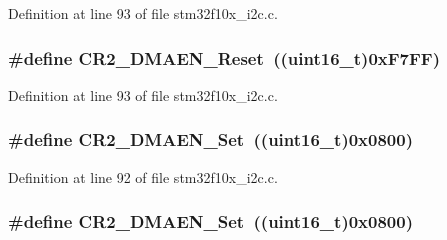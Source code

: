 Definition at line 93 of file stm32f10x\+\_\+i2c.\+c.

\subsubsection[{\texorpdfstring{C\+R2\+\_\+\+D\+M\+A\+E\+N\+\_\+\+Reset}{CR2_DMAEN_Reset}}]{\setlength{\rightskip}{0pt plus 5cm}\#define C\+R2\+\_\+\+D\+M\+A\+E\+N\+\_\+\+Reset~(({\bf uint16\+\_\+t})0x\+F7\+F\+F)}\hypertarget{group___i2_c___private___defines_gabe742f89a768e29b9a2d86f7782991a6}{}\label{group___i2_c___private___defines_gabe742f89a768e29b9a2d86f7782991a6}


Definition at line 93 of file stm32f10x\+\_\+i2c.\+c.

\subsubsection[{\texorpdfstring{C\+R2\+\_\+\+D\+M\+A\+E\+N\+\_\+\+Set}{CR2_DMAEN_Set}}]{\setlength{\rightskip}{0pt plus 5cm}\#define C\+R2\+\_\+\+D\+M\+A\+E\+N\+\_\+\+Set~(({\bf uint16\+\_\+t})0x0800)}\hypertarget{group___i2_c___private___defines_gafe82da50fa03bd5ecb36340da64c87ca}{}\label{group___i2_c___private___defines_gafe82da50fa03bd5ecb36340da64c87ca}


Definition at line 92 of file stm32f10x\+\_\+i2c.\+c.

\subsubsection[{\texorpdfstring{C\+R2\+\_\+\+D\+M\+A\+E\+N\+\_\+\+Set}{CR2_DMAEN_Set}}]{\setlength{\rightskip}{0pt plus 5cm}\#define C\+R2\+\_\+\+D\+M\+A\+E\+N\+\_\+\+Set~(({\bf uint16\+\_\+t})0x0800)}\hypertarget{group___i2_c___private___defines_gafe82da50fa03bd5ecb36340da64c87ca}{}\label{group___i2_c___private___defines_gafe82da50fa03bd5ecb36340da64c87ca}


